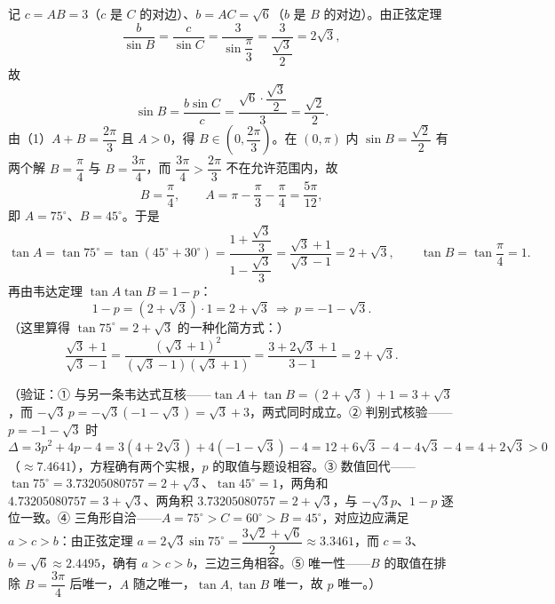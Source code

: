 \begin{answer}

记 \(c=AB=3\)（\(c\) 是 \(C\) 的对边）、\(b=AC=\sqrt{6}\)（\(b\) 是 \(B\) 的对边）。由正弦定理
\nopagebreak[4]
\[
\frac{b}{\sin B}=\frac{c}{\sin C}=\frac{3}{\sin\dfrac{\pi}{3}}=\frac{3}{\dfrac{\sqrt{3}}{2}}=2\sqrt{3},
\]
故
\nopagebreak[4]
\[
\sin B=\frac{b\sin C}{c}=\frac{\sqrt{6}\cdot\dfrac{\sqrt{3}}{2}}{3}=\frac{\sqrt{2}}{2}.
\]
由（1）\(A+B=\dfrac{2\pi}{3}\) 且 \(A>0\)，得 \(B\in\left(0,\dfrac{2\pi}{3}\right)\)。在 \((0,\pi)\) 内 \(\sin B=\dfrac{\sqrt{2}}{2}\) 有两个解 \(B=\dfrac{\pi}{4}\) 与 \(B=\dfrac{3\pi}{4}\)，而 \(\dfrac{3\pi}{4}>\dfrac{2\pi}{3}\) 不在允许范围内，故
\nopagebreak[4]
\[
B=\frac{\pi}{4},\qquad A=\pi-\frac{\pi}{3}-\frac{\pi}{4}=\frac{5\pi}{12},
\]
即 \(A=75^{\circ}\)、\(B=45^{\circ}\)。于是
\nopagebreak[4]
\[
\tan A=\tan 75^{\circ}=\tan(45^{\circ}+30^{\circ})=\frac{1+\dfrac{\sqrt{3}}{3}}{1-\dfrac{\sqrt{3}}{3}}=\frac{\sqrt{3}+1}{\sqrt{3}-1}=2+\sqrt{3},
\qquad \tan B=\tan\frac{\pi}{4}=1 .
\]
再由韦达定理 \(\tan A\tan B=1-p\)：
\nopagebreak[4]
\[
1-p=(2+\sqrt{3})\cdot1=2+\sqrt{3}\ \Longrightarrow\ p=-1-\sqrt{3}.
\]
（这里算得 \(\tan 75^{\circ}=2+\sqrt{3}\) 的一种化简方式：）
\nopagebreak[4]
\[
\frac{\sqrt{3}+1}{\sqrt{3}-1}=\frac{(\sqrt{3}+1)^{2}}{(\sqrt{3}-1)(\sqrt{3}+1)}=\frac{3+2\sqrt{3}+1}{3-1}=2+\sqrt{3}.
\]

（验证：① 与另一条韦达式互核——\(\tan A+\tan B=(2+\sqrt{3})+1=3+\sqrt{3}\)，而 \(-\sqrt{3}\,p=-\sqrt{3}(-1-\sqrt{3})=\sqrt{3}+3\)，两式同时成立。② 判别式核验——\(p=-1-\sqrt{3}\) 时
\nopagebreak[4]
\[
\Delta=3p^{2}+4p-4=3(4+2\sqrt{3})+4(-1-\sqrt{3})-4=12+6\sqrt{3}-4-4\sqrt{3}-4=4+2\sqrt{3}>0
\]
（\(\approx7.4641\)），方程确有两个实根，\(p\) 的取值与题设相容。③ 数值回代——\(\tan 75^{\circ}=3.73205080757=2+\sqrt{3}\)、\(\tan 45^{\circ}=1\)，两角和 \(4.73205080757=3+\sqrt{3}\)、两角积 \(3.73205080757=2+\sqrt{3}\)，与 \(-\sqrt{3}p\)、\(1-p\) 逐位一致。④ 三角形自洽——\(A=75^{\circ}>C=60^{\circ}>B=45^{\circ}\)，对应边应满足 \(a>c>b\)：由正弦定理 \(a=2\sqrt{3}\sin75^{\circ}=\dfrac{3\sqrt{2}+\sqrt{6}}{2}\approx3.3461\)，而 \(c=3\)、\(b=\sqrt{6}\approx2.4495\)，确有 \(a>c>b\)，三边三角相容。⑤ 唯一性——\(B\) 的取值在排除 \(B=\dfrac{3\pi}{4}\) 后唯一，\(A\) 随之唯一，\(\tan A,\tan B\) 唯一，故 \(p\) 唯一。）



\end{answer}
